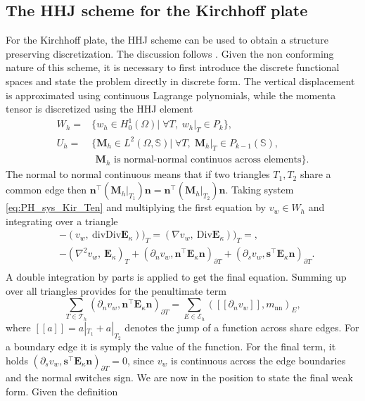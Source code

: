 \documentclass{ifacconf}
\begin{document}
\subsection{The HHJ scheme for the Kirchhoff plate}
For the Kirchhoff plate, the HHJ scheme can be used to obtain a structure preserving discretization. The discussion follows \cite{arnold2019hellan}. Given the non conforming nature of this scheme, it is necessary to first introduce the discrete functional spaces and state the problem directly in discrete form. The vertical displacement is approximated using continuous Lagrange polynomials, while the momenta tensor is discretized using the HHJ element
\begin{equation}
\label{eq:HHJ}
\begin{aligned}
W_h = &\{w_h \in H^1_0(\Omega)| \; \forall T, \; w_h|_{T} \in P_{k} \}, \\
U_h = &\{\bm{M}_h \in L^2(\Omega, \mathbb{S})| \; \forall T, \; \bm{M}_h|_{T} \in P_{k-1}(\mathbb{S}) , \\ 
&\, \ \bm{M}_h \text{ is normal-normal continuos across elements}\}.
\end{aligned}
\end{equation}
The normal to normal continuous means that if two triangles $T_1, T_2$ share a common edge then $\bm{n}^\top (\bm{M}_h|_{T_1}) \bm{n} = \bm{n}^\top (\bm{M}_h|_{T_2}) \bm{n}$. Taking system \eqref{eq:PH_sys_Kir_Ten} and multiplying the first equation by $v_w \in W_h$ and integrating over a triangle
\begin{equation*}
	\begin{aligned}
	& - (v_w, \ \mathrm{div}\mathrm{Div} \bm{E}_\kappa))_{T} = (\nabla v_w, \ \mathrm{Div} \bm{E}_\kappa))_{T}=, \\
	& -(\nabla^2 v_w, \ \bm{E}_\kappa)_T + (\partial_n v_w, \bm{n}^\top\bm{E}_\kappa \bm{n})_{\partial T} + (\partial_s v_w, \bm{s}^\top\bm{E}_\kappa \bm{n})_{\partial T}. \\
	\end{aligned}
\end{equation*}
A double integration by parts is applied to get the final equation. Summing up over all triangles provides for the penultimate term
\begin{equation*}
\sum_{T \in \mathcal{T}_h} (\partial_n v_w, \bm{n}^\top\bm{E}_\kappa \bm{n})_{\partial T} = \sum_{E \in \mathcal{E}_h} ([\![\partial_n v_w]\!], m_{\text{nn}})_{E},
\end{equation*} 
where $[\![a]\!] = a|_{T_1} + a|_{T_2}$ denotes the jump of a function across share edges. For a boundary edge it is symply the value of the function. For the final term, it holds $(\partial_s v_w, \bm{s}^\top\bm{E}_\kappa \bm{n})_{\partial T}=0$, since $v_w$ is continuous across the edge boundaries and the normal switches sign. We are now in the position to state the final weak form. Given the definition
\end{document}

